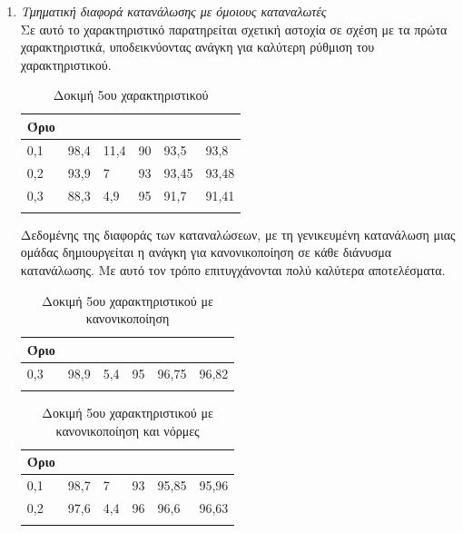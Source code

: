 \begin{enumerate}
\item{\textit{Τμηματική διαφορά κατανάλωσης με όμοιους καταναλωτές}} \\
Σε αυτό το χαρακτηριστικό παρατηρείται σχετική αστοχία σε σχέση με τα πρώτα χαρακτηριστικά, υποδεικνύοντας ανάγκη για καλύτερη ρύθμιση του χαρακτηριστικού. 
\begin{center}
\begin{longtabu} to 0.8\textwidth { | X[c] || X[c] | X[c] | X[c] | X[c] | X[c] |  }
 \hline
  Όριο &   &  &  &  & \\
 ,1&	98,4&	11,4&	90&	93,5&	93,8\\
0,2&	93,9&	7&	93&	93,45	&93,48\\
0,3&	88,3&	4,9&	95&	91,7	&91,41\\
\hline
\caption{Δοκιμή 5ου χαρακτηριστικού}
\label{testfeat5}
\end{longtabu}
\end{center}
Δεδομένης της διαφοράς των καταναλώσεων, με τη γενικευμένη κατανάλωση μιας ομάδας δημιουργείται η ανάγκη για κανονικοποίηση σε κάθε διάνυσμα κατανάλωσης. Με αυτό τον τρόπο επιτυγχάνονται πολύ καλύτερα αποτελέσματα.
\begin{center}
\begin{longtabu} to 0.8\textwidth { | X[c] || X[c] | X[c] | X[c] | X[c] | X[c] |  }
 \hline
  Όριο &   &  &  &  & \\
 ,3&	98,9&	5,4&	95&	96,75&	96,82\\
\hline
\caption{Δοκιμή 5ου χαρακτηριστικού με κανονικοποίηση}
\label{testfeat5normalized}
\end{longtabu}
\end{center}

\begin{center}
\begin{longtabu} to 0.8\textwidth { | X[c] || X[c] | X[c] | X[c] | X[c] | X[c] |  }
 \hline
  Όριο &   &  &  &  & \\
 ,1&	98,7&	7&	93&	95,85&	95,96\\
0,2&	97,6&	4,4&96&	96,6&	96,63\\
\hline
\caption{Δοκιμή 5ου χαρακτηριστικού με κανονικοποίηση και νόρμες}
\label{testfeat5normalizednorms}
\end{longtabu}
\end{center}


\end{enumerate}
